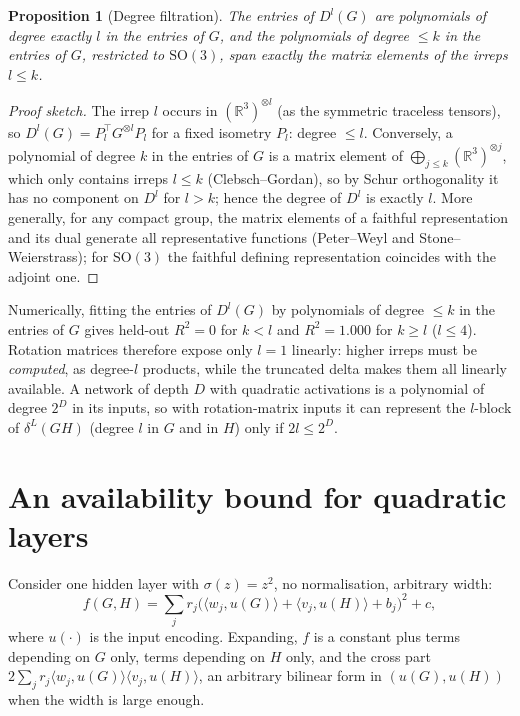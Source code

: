 \documentclass[a4paper,11pt]{article}
\newtheorem{proposition}{Proposition}
\theoremstyle{remark}
\theoremstyle{definition}
\newcommand{\R}{\mathbb{R}}
\newcommand{\SO}{\mathrm{SO}(3)}
\newcommand{\ip}[2]{\langle #1, #2 \rangle}
\begin{document}
\begin{proposition}[Degree filtration]\label{prop:degree}
The entries of $D^l(G)$ are polynomials of degree exactly $l$ in the entries of
$G$, and the polynomials of degree $\le k$ in the entries of $G$, restricted to
$\SO$, span exactly the matrix elements of the irreps $l\le k$.
\end{proposition}

\begin{proof}[Proof sketch]
The irrep $l$ occurs in $(\R^3)^{\otimes l}$ (as the symmetric traceless tensors),
so $D^l(G)=P_l^\top G^{\otimes l}P_l$ for a fixed isometry $P_l$: degree $\le l$.
Conversely, a polynomial of degree $k$ in the entries of $G$ is a matrix element of
$\bigoplus_{j\le k}(\R^3)^{\otimes j}$, which only contains irreps $l\le k$
(Clebsch--Gordan), so by Schur orthogonality it has no component on $D^l$ for
$l>k$; hence the degree of $D^l$ is exactly $l$. More generally, for any compact
group, the matrix elements of a faithful representation and its dual generate all
representative functions (Peter--Weyl and Stone--Weierstrass); for $\SO$ the
faithful defining representation coincides with the adjoint one.
\end{proof}

Numerically, fitting the entries of $D^l(G)$ by polynomials of degree $\le k$ in the
entries of $G$ gives held-out $R^2=0$ for $k<l$ and $R^2=1.000$ for $k\ge l$
($l\le4$). Rotation matrices therefore expose only $l=1$ linearly: higher irreps
must be \emph{computed}, as degree-$l$ products, while the truncated delta makes
them all linearly available. A network of depth $D$ with quadratic activations is a
polynomial of degree $2^D$ in its inputs, so with rotation-matrix inputs it can
represent the $l$-block of $\delta^L(GH)$ (degree $l$ in $G$ and in $H$) only if
$2l\le2^D$.

\section{An availability bound for quadratic layers}
\label{sec:capacity}

Consider one hidden layer with $\sigma(z)=z^2$, no normalisation, arbitrary
width:
\begin{equation}\label{eq:net}
f(G,H)=\sum_j r_j\bigl(\ip{w_j}{u(G)}+\ip{v_j}{u(H)}+b_j\bigr)^2+c ,
\end{equation}
where $u(\cdot)$ is the input encoding. Expanding, $f$ is a constant plus terms
depending on $G$ only, terms depending on $H$ only, and the cross part
$2\sum_j r_j\ip{w_j}{u(G)}\ip{v_j}{u(H)}$, an arbitrary bilinear form in
$(u(G),u(H))$ when the width is large enough.
\end{document}
